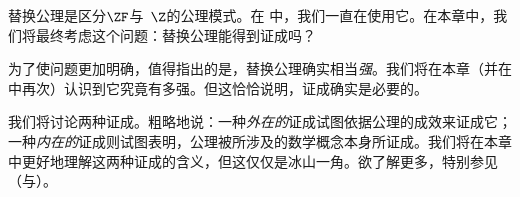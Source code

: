 \documentclass[../../../include/open-logic-section]{subfiles}
\begin{document}

替换公理是区分$\ZF$与~$\Z$的公理模式。在
中，我们一直在使用它。在本章中，我们将最终考虑这个问题：替换公理能得到证成吗？

为了使问题更加明确，值得指出的是，替换公理确实相当\emph{强}。我们将在本章（并在中再次）认识到它究竟有多强。但这恰恰说明，证成确实是必要的。

我们将讨论两种证成。粗略地说：一种\emph{外在的}证成试图依据公理的成效来证成它；一种\emph{内在的}证成则试图表明，公理被所涉及的数学概念本身所证成。我们将在本章中更好地理解这两种证成的含义，但这仅仅是冰山一角。欲了解更多，特别参见\citeauthor{Maddy1988a}（\citeyear{Maddy1988a}与\citeyear{Maddy1988b}）。
\end{document}
